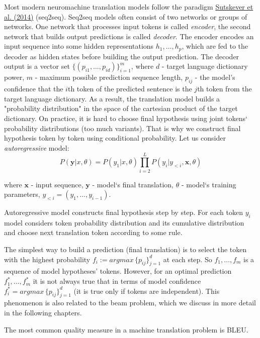 \documentclass[a4paper,14pt]{extarticle}
\newcommand{\bibref}[3]{\hyperlink{#1}{#2 (#3)}}
\begin{document}
	Most modern neuromachine translation models follow the paradigm \bibref{seq2seq}{Sutskever et al.}{2014} (seq2seq). Seq2seq models often consist of two networks or groups of networks. One network that processes input tokens is called \textit{encoder}, the second network that builds output predictions is called \textit{decoder}. The encoder encodes an input sequence into some hidden representations $h_1, \dots, h_p$, which are fed to the decoder as hidden states before building the output prediction. The decoder output is a vector set $\{(p_{i1}, \dots, p_{id})\}_{i=1}^{m}$, where $d$ - target language dictionary power, $m$ - maximum possible prediction sequence length, $p_{ij}$ - the model's confidence that the $i$th token of the predicted sentence is the $j$th token from the target language dictionary. As a result, the translation model builds a "probability distribution" in the space of the cartesian product of the target dictionary. On practice, it is hard to choose final hypothesis using joint tokens` probability distributions (too much variants). That is why we construct final hypothesis token by token using conditional probability. Let us consider \textit{autoregressive} model:
	\begin{equation}
		P(\textbf{y} | x, \theta) = P(y_1 | x, \theta) \prod_{i=2}^{L} P(y_i | y_{<i}, \textbf{x}, \theta)
		\label{eqn:autoregressive}
	\end{equation}
	
	where $\textbf{x}$ - input sequence, $\textbf{y}$ - model`s final translation, $\theta$ - model`s training parameters, $y_{<i} = (y_1, \dots, y_{i - 1})$.
	
	Autoregressive model constructs final hypothesis step by step. For each token $y_i$ model considers token probability distribution and its cumulative distribution and choose next translation token according to some rule.

	The simplest way to build a prediction (final translation) is to select the token with the highest probability $f_i := argmax \, \{p_{ij}\}_{j=1}^{d}$ at each step. So $f_1, \dots, f_m$ is a sequence of model hypotheses' tokens. However, for an optimal prediction $f_1^*, \dots, f_m^*$ it is not always true that in terms of model confidence $f_i^* = argmax \, \{p_{ij}\}_{j=1}^{d}$ (it is true only if tokens are independent). This phenomenon is also related to the beam problem, which we discuss in more detail in the following chapters.
	
	The most common quality measure in a machine translation problem is BLEU.
	
\end{document}
